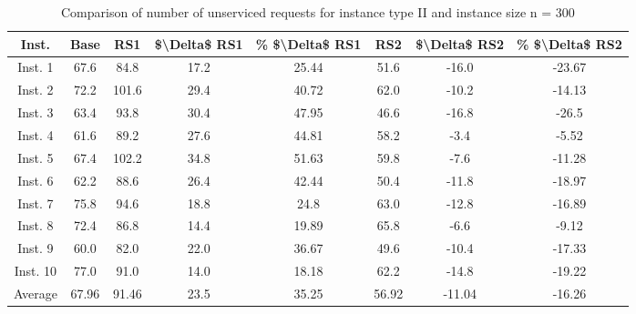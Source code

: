 \begin{table}[H]
\centering
\begin{tabular}{cccccccc}
  \hline
  \textbf{Inst.} & \textbf{Base} & \textbf{RS1} & \textbf{\$\textbackslash{}Delta\$  RS1} & \textbf{\% \$\textbackslash{}Delta\$  RS1} & \textbf{RS2} & \textbf{\$\textbackslash{}Delta\$  RS2} & \textbf{\% \$\textbackslash{}Delta\$  RS2} \\\hline
  Inst. 1 & 67.6 & 84.8 & 17.2 & 25.44 & 51.6 & -16.0 & -23.67 \\
  Inst. 2 & 72.2 & 101.6 & 29.4 & 40.72 & 62.0 & -10.2 & -14.13 \\
  Inst. 3 & 63.4 & 93.8 & 30.4 & 47.95 & 46.6 & -16.8 & -26.5 \\
  Inst. 4 & 61.6 & 89.2 & 27.6 & 44.81 & 58.2 & -3.4 & -5.52 \\
  Inst. 5 & 67.4 & 102.2 & 34.8 & 51.63 & 59.8 & -7.6 & -11.28 \\
  Inst. 6 & 62.2 & 88.6 & 26.4 & 42.44 & 50.4 & -11.8 & -18.97 \\
  Inst. 7 & 75.8 & 94.6 & 18.8 & 24.8 & 63.0 & -12.8 & -16.89 \\
  Inst. 8 & 72.4 & 86.8 & 14.4 & 19.89 & 65.8 & -6.6 & -9.12 \\
  Inst. 9 & 60.0 & 82.0 & 22.0 & 36.67 & 49.6 & -10.4 & -17.33 \\
  Inst. 10 & 77.0 & 91.0 & 14.0 & 18.18 & 62.2 & -14.8 & -19.22 \\
  Average & 67.96 & 91.46 & 23.5 & 35.25 & 56.92 & -11.04 & -16.26 \\\hline
\end{tabular}
\caption{Comparison of number of unserviced requests for instance type II and instance size n = 300}
\label{tab:wait:resrelocation-nTaxi-comparison_II_300}
\end{table}
